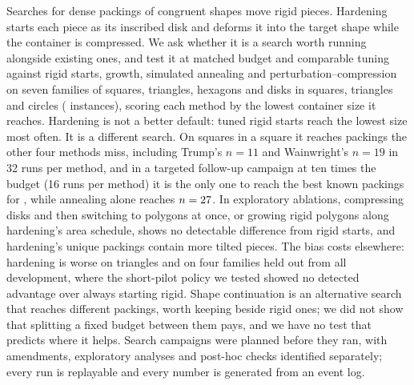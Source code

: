 Searches for dense packings of congruent shapes move rigid pieces. Hardening starts each piece as its inscribed disk and deforms it into the target shape while the container is compressed. We ask whether it is a search worth running alongside existing ones, and test it at matched budget and comparable tuning against rigid starts, growth, simulated annealing and perturbation--compression on seven families of squares, triangles, hexagons and disks in squares, triangles and circles (\CsevenInstances{} instances), scoring each method by the lowest container size it reaches. Hardening is not a better default: tuned rigid starts reach the lowest size most often. It is a different search. On squares in a square it reaches packings the other four methods miss, including Trump's $n=11$ and Wainwright's $n=19$ in 32 runs per method, and in a targeted follow-up campaign at ten times the budget (16 runs per method) it is the only one to reach the best known packings for \LongHardenOnlyReachedNewNs, while annealing alone reaches $n=27$. In exploratory ablations, compressing disks and then switching to polygons at once, or growing rigid polygons along hardening's area schedule, shows no detectable difference from rigid starts, and hardening's unique packings contain more tilted pieces. The bias costs elsewhere: hardening is worse on triangles and on four families held out from all development, where the short-pilot policy we tested showed no detected advantage over always starting rigid. Shape continuation is an alternative search that reaches different packings, worth keeping beside rigid ones; we did not show that splitting a fixed budget between them pays, and we have no test that predicts where it helps. Search campaigns were planned before they ran, with amendments, exploratory analyses and post-hoc checks identified separately; every run is replayable and every number is generated from an event log.
